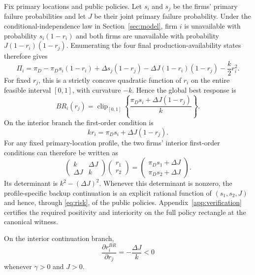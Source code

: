 Fix primary locations and public policies. Let $s_i$ and $s_j$ be the firms' primary failure probabilities and let $J$ be their joint primary failure probability. Under the conditional-independence law in Section~\ref{sec:model}, firm $i$ is unavailable with probability $s_i(1-r_i)$ and both firms are unavailable with probability $J(1-r_i)(1-r_j)$. Enumerating the four final production-availability states therefore gives
\begin{equation}
\Pi_i
=\pi_D-\pi_D s_i(1-r_i)
+\Delta s_j(1-r_j)
-\Delta J(1-r_i)(1-r_j)
-\frac{k}{2}r_i^2.
\label{eq:expected-profit}
\end{equation}
For fixed $r_j$, this is a strictly concave quadratic function of $r_i$ on the entire feasible interval $[0,1]$, with curvature $-k$. Hence the global best response is
\begin{equation}
BR_i(r_j)=\operatorname{clip}_{[0,1]}
\left\{\frac{\pi_D s_i+\Delta J(1-r_j)}{k}\right\}.
\label{eq:backup-br-global}
\end{equation}
On the interior branch the first-order condition is
\begin{equation}
kr_i=\pi_D s_i+\Delta J(1-r_j).
\label{eq:backup-foc}
\end{equation}
For any fixed primary-location profile, the two firms' interior first-order conditions can therefore be written as
\begin{equation}
\begin{pmatrix}
k & \Delta J\\
\Delta J & k
\end{pmatrix}
\begin{pmatrix}
r_1\\
r_2
\end{pmatrix}
=
\begin{pmatrix}
\pi_D s_1+\Delta J\\
\pi_D s_2+\Delta J
\end{pmatrix}.
\label{eq:backup-linear-system}
\end{equation}
Its determinant is $k^2-(\Delta J)^2$. Whenever this determinant is nonzero, the profile-specific backup continuation is an explicit rational function of $(s_1,s_2,J)$ and hence, through \eqref{eq:risk}, of the public policies. Appendix~\ref{app:verification} certifies the required positivity and interiority on the full policy rectangle at the canonical witness.

\begin{proposition}\label{prop:strategic-sub}
On the interior continuation branch,
\begin{equation}
\frac{\partial r_i^{BR}}{\partial r_j}=-\frac{\Delta J}{k}<0
\end{equation}
whenever $\gamma>0$ and $J>0$.
\end{proposition}

